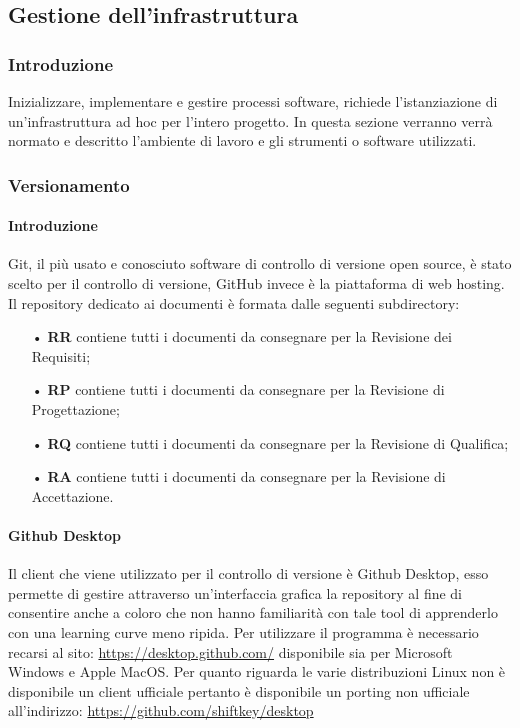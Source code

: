 \subsection{Gestione dell'infrastruttura}




\subsubsection{Introduzione}
Inizializzare, implementare e gestire processi software, richiede l’istanziazione di un’infrastruttura ad hoc per l'intero progetto. In questa sezione verranno verrà normato e descritto l’ambiente di lavoro e gli strumenti o software utilizzati.

\subsubsection{Versionamento}

\paragraph{Introduzione}
Git, il più usato e conosciuto {software di controllo di versione} {open source}, è stato scelto per il controllo di versione, GitHub invece è la piattaforma di web hosting. 
\newline
Il repository dedicato ai documenti è formata dalle seguenti subdirectory:
\begin{itemize}
\item[•] \textbf{RR} contiene tutti i documenti da consegnare per la Revisione dei Requisiti;
\item[•] \textbf{RP} contiene tutti i documenti da consegnare per la Revisione di Progettazione;
\item[•] \textbf{RQ} contiene tutti i documenti da consegnare per la Revisione di Qualifica;
\item[•] \textbf{RA} contiene tutti i documenti da consegnare per la Revisione di Accettazione.
\end{itemize}

\paragraph{Github Desktop}
Il {client} che viene utilizzato per il controllo di versione è Github Desktop, esso permette di gestire attraverso un'interfaccia grafica la {repository} al fine di consentire anche a coloro che non hanno familiarità con tale tool di apprenderlo con una {learning curve} meno ripida. Per utilizzare il programma è necessario recarsi al sito: \url{https://desktop.github.com/} disponibile sia per {Microsoft Windows} e {Apple MacOS}. Per quanto riguarda le varie {distribuzioni Linux} non è disponibile un client ufficiale pertanto è disponibile un {porting} non ufficiale all'indirizzo: \url{https://github.com/shiftkey/desktop}
